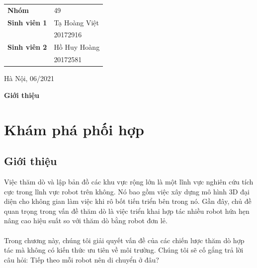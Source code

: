 \documentclass[11pt,openany]{book}
\begin{document}
\begin{titlepage}
\begin{center}
        \vspace{1cm}
        \Large
        \begin{center}
            \begin{tabular}{ l l }
                \textbf{Nhóm}        & 49            \\
                \textbf{Sinh viên 1} & Tạ Hoàng Việt \\
                                     & 20172916      \\
                \textbf{Sinh viên 2} & Hồ Huy Hoàng  \\
                                     & 20172581
            \end{tabular}
        \end{center}
        \vspace{1cm}
        \normalsize
        Hà Nội, 06/2021
    \end{center}
\end{titlepage}
\tableofcontents
\listoffigures
\listoftables
\newpage
\thispagestyle{plain}
\begin{center}
    \Huge
    \textbf{Giới thiệu}
\end{center}
\chapter{Khám phá phối hợp}
\section{Giới thiệu}
Việc thăm dò và lập bản đồ các khu vực rộng lớn là một lĩnh vực nghiên cứu tích cực trong lĩnh vực robot trên không. Nó bao gồm việc xây dựng mô hình 3D đại diện cho không gian làm việc khi rô bốt tiến triển bên trong nó. Gần đây, chủ đề quan trọng trong vấn đề thăm dò là việc triển khai hợp tác nhiều robot hứa hẹn nâng cao hiệu suất so với thăm dò bằng robot đơn lẻ.\\\\
Trong chương này, chúng tôi giải quyết vấn đề của các chiến lược thăm dò hợp tác mà không có kiến thức ưu tiên về môi trường. Chúng tôi sẽ cố gắng trả lời câu hỏi: Tiếp theo mỗi robot nên di chuyển ở đâu?
\end{document}
